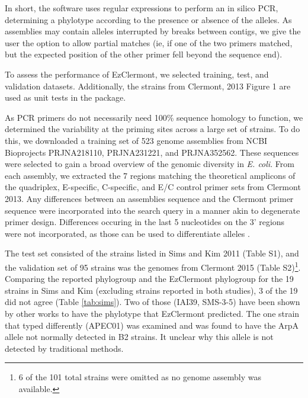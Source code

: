 In short, the software uses regular expressions to perform an in silico PCR, determining a phylotype according to the presence or absence of the alleles. As assemblies may contain alleles interrupted by breaks between contigs, we give the user the option to allow partial matches (ie, if one of the two primers matched, but the expected position of the other primer fell beyond the sequence end).

To assess the performance of EzClermont, we selected training,  test, and validation datasets.  Additionally, the strains from Clermont, 2013 Figure 1 are used as unit tests in the package.

As PCR primers do not necessarily need 100\% sequence homology to function, we determined the variability at the priming sites across a large set of  strains. To do this, we downloaded a training set of 523 genome assemblies from NCBI Bioprojects PRJNA218110\cite{lindsey_multiplex_2017}, PRJNA231221\cite{sichtig_fdaargos_2019}, and PRJNA352562.  These sequences were selected to gain a broad overview of the genomic diversity in \textit{E. coli}. From each assembly, we extracted the 7 regions matching the theoretical amplicons of the quadriplex, E-specific, C-specific, and E/C control primer sets from Clermont 2013.  Any differences between an assemblies sequence and the Clermont primer sequence were incorporated into the search query in a manner akin to degenerate primer design. Differences occuring in the last 5 nucleotides on the 3’ regions were not incorporated, as those can be used to differentiate alleles \cite{Stadhouders2010}.


The test set consisted of the strains listed in Sims and Kim 2011\cite{Sims2011} (Table S1), and the validation set of 95 strains was the genomes from Clermont 2015\cite{Denamur2015} (Table S2)\footnote{6 of the 101 total strains were omitted as no genome assembly was available.}.  Comparing the reported phylogroup and the EzClermont phylogroup for the 19 strains in Sims and Kim (excluding strains reported in both studies),  3 of the 19 did not agree (Table \ref{tab:sims}). Two of those (IAI39, SMS-3-5) have been shown by other works to have the phylotype that EzClermont predicted. The one strain that typed differently (APEC01) was examined and was found to have the ArpA allele not normally detected in B2 strains. It unclear why this allele is not detected by traditional methods.





